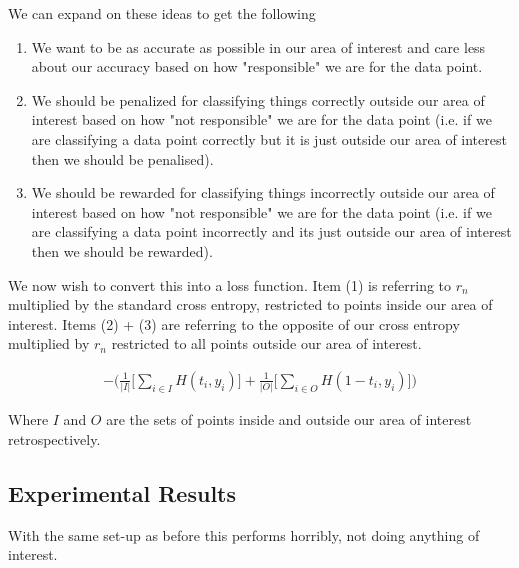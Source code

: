 \documentclass[notitlepage]{report}
\theoremstyle{definition}
\begin{document}
We can expand on these ideas to get the following

\begin{enumerate}
\item We want to be as accurate as possible in our area of interest and care less about our accuracy based on how "responsible" we are for the data point.
\item We should be penalized for classifying things correctly outside our area of interest based on how "not responsible" we are for the data point (i.e. if we are classifying a data point correctly but it is just outside our area of interest then we should be penalised).
\item We should be rewarded for classifying things incorrectly outside our area of interest based on how "not responsible" we are for the data point (i.e. if we are classifying a data point incorrectly and its just outside our area of interest then we should be rewarded).
\end{enumerate}

We now wish to convert this into a loss function. Item (1) is referring to $r_n$ multiplied by the standard cross entropy, restricted to points inside our area of interest. Items (2) + (3) are referring to the opposite of our cross entropy multiplied by $r_n$ restricted to all points outside our area of interest.

\begin{align}
- \big( \frac{1}{|I|} \big[ \sum_{i \in I} H(t_i, y_i) \big] + \frac{1}{|O|} \big[ \sum_{i \in O} H(1 - t_i, y_i) \big] \big)
\end{align}

Where $I$ and $O$ are the sets of points inside and outside our area of interest retrospectively.

\subsection{Experimental Results}

With the same set-up as before this performs horribly, not doing anything of interest.
\end{document}
